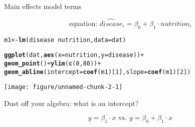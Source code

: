 \documentclass[table]{beamer}\usepackage[]{graphicx}\usepackage[]{color}
\makeatletter
\def\maxwidth{ %
  \ifdim\Gin@nat@width>\linewidth
    \linewidth
  \else
    \Gin@nat@width
  \fi
}
\newcommand{\hlnum}[1]{\textcolor[rgb]{0.686,0.059,0.569}{#1}}%
\newcommand{\hlopt}[1]{\textcolor[rgb]{0,0,0}{#1}}%
\newcommand{\hlstd}[1]{\textcolor[rgb]{0.345,0.345,0.345}{#1}}%
\newcommand{\hlkwb}[1]{\textcolor[rgb]{0.69,0.353,0.396}{#1}}%
\newcommand{\hlkwc}[1]{\textcolor[rgb]{0.333,0.667,0.333}{#1}}%
\newcommand{\hlkwd}[1]{\textcolor[rgb]{0.737,0.353,0.396}{\textbf{#1}}}%
\newenvironment{kframe}{%
 \def\at@end@of@kframe{}%
 \ifinner\ifhmode%
  \def\at@end@of@kframe{\end{minipage}}%
  \begin{minipage}{\columnwidth}%
 \fi\fi%
 \def\FrameCommand##1{\hskip\@totalleftmargin \hskip-\fboxsep
 \colorbox{shadecolor}{##1}\hskip-\fboxsep
     \hskip-\linewidth \hskip-\@totalleftmargin \hskip\columnwidth}%
 \MakeFramed {\advance\hsize-\width
   \@totalleftmargin\z@ \linewidth\hsize
   \@setminipage}}%
 {\par\unskip\endMakeFramed%
 \at@end@of@kframe}
\newenvironment{knitrout}{}{} %
\makeatother
\begin{document}

\begin{frame}[fragile]{Main effects model terms}

$$ \mbox{equation: \ }  \widehat{disease}_i = \beta_0 + \beta_1\cdot nutrition_i $$

\begin{knitrout}\scriptsize
{}\color{fgcolor}\begin{kframe}
\begin{alltt}
\hlstd{m1} \hlkwb{<-} \hlkwd{lm}\hlstd{(disease} \hlopt{~} \hlstd{nutrition,} \hlkwc{data}\hlstd{=dat)}
\end{alltt}
\end{kframe}
\end{knitrout}

\begin{knitrout}\scriptsize
{}\color{fgcolor}\begin{kframe}
\begin{alltt}
\hlkwd{ggplot}\hlstd{(dat,} \hlkwd{aes}\hlstd{(}\hlkwc{x}\hlstd{=nutrition,} \hlkwc{y}\hlstd{=disease))} \hlopt{+}
  \hlkwd{geom_point}\hlstd{()} \hlopt{+} \hlkwd{ylim}\hlstd{(}\hlkwd{c}\hlstd{(}\hlnum{0}\hlstd{,}\hlnum{80}\hlstd{))} \hlopt{+}
  \hlkwd{geom_abline}\hlstd{(}\hlkwc{intercept} \hlstd{=} \hlkwd{coef}\hlstd{(m1)[}\hlnum{1}\hlstd{],} \hlkwc{slope} \hlstd{=} \hlkwd{coef}\hlstd{(m1)[}\hlnum{2}\hlstd{])}
\end{alltt}
\end{kframe}
\texttt{[image: figure/unnamed-chunk-2-1]} 
\end{knitrout}


\end{frame}



\begin{frame}[fragile]{Dust off your algebra: what is an intercept?}

$$ y = \beta_1 \cdot x \mbox{\ \ \ \  vs. \ \ \ \ } y = \beta_0 + \beta_1 \cdot x $$

\vspace{12em}


\end{frame}

\end{document}
